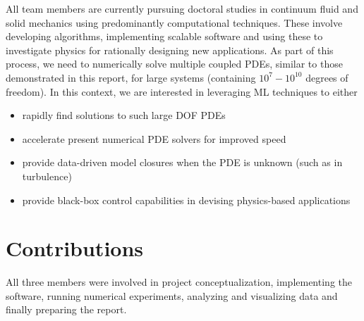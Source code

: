 \documentclass[11pt]{article}
\begin{document}
All team members are currently pursuing doctoral studies in continuum fluid
and solid mechanics using predominantly computational techniques. These involve
developing algorithms, implementing scalable software and using these to
investigate physics for rationally designing new applications. As part of this
process, we need to numerically solve multiple coupled PDEs, similar to those
demonstrated in this report, for large systems (containing \(10^7-10^{10}\)
degrees of freedom). In this context, we are interested in leveraging ML techniques to either
\begin{itemize}
\item rapidly find solutions to such large DOF PDEs
\item accelerate present numerical PDE solvers for improved speed
\item provide data-driven model closures when the PDE is unknown (such as in
turbulence)
\item provide black-box control capabilities in devising physics-based applications
\end{itemize}

\section{Contributions}
\label{sec:org3be66b6}
All three members were involved in project conceptualization, implementing the
software, running numerical experiments, analyzing and visualizing data and finally
preparing the report.


 \newpage




\end{document}
